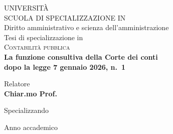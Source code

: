 \thispagestyle{empty}
\begin{center}

{\large UNIVERSITÀ }\\[0.4cm]
{\normalsize SCUOLA DI SPECIALIZZAZIONE IN }\\[0.2cm]
{\normalsize Diritto amministrativo e scienza dell'amministrazione}\\[2.5cm]

{\normalsize Tesi di specializzazione in}\\[0.3cm]
{\large\scshape Contabilità pubblica}\\[2.5cm]

{\Large\bfseries La funzione consultiva della Corte dei conti}\\[0.4cm]
{\Large\bfseries dopo la legge 7 gennaio 2026, n.~1}\\[3.5cm]

\begin{minipage}[t]{0.45\textwidth}
\raggedright
\normalsize
Relatore\\
\textbf{Chiar.mo Prof. }
\end{minipage}
\hfill
\begin{minipage}[t]{0.45\textwidth}
\raggedleft
\normalsize
Specializzando\\
\textbf{}
\end{minipage}

\vfill
{\normalsize Anno accademico }

\end{center}
\cleardoublepage
